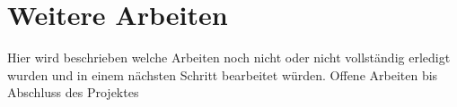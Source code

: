 \section{Weitere Arbeiten}
Hier wird beschrieben welche Arbeiten noch nicht oder nicht vollständig erledigt wurden und in einem nächsten Schritt bearbeitet würden.
Offene Arbeiten bis Abschluss des Projektes